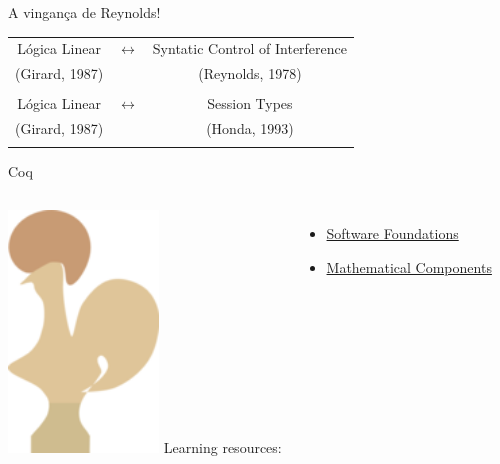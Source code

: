 \documentclass{beamer}
\begin{document}
\begin{frame}{A vingança de Reynolds!}

\begin{block}{}

\begin{center}
\begin{tabular}{ c c c }
 Lógica Linear & $\longleftrightarrow$ & Syntatic Control of Interference \\ 
 (Girard, 1987) &  & (Reynolds, 1978) \\  
                 &  &  \\
 Lógica Linear & $\longleftrightarrow$ & Session Types \\ 
 (Girard, 1987) &  & (Honda, 1993) \\  
                 &  &      
\end{tabular}
\end{center}

\end{block}

\end{frame}


\begin{frame}{Coq}
\begin{columns}
\centering
\includegraphics[width=4cm]{coq.png}
Learning resources:

\begin{itemize}
\item \href{https://softwarefoundations.cis.upenn.edu/}{Software Foundations}
\item \href{https://math-comp.github.io/mcb/}{Mathematical Components}
\end{itemize}
\end{columns} 
\end{frame}
\end{document}
